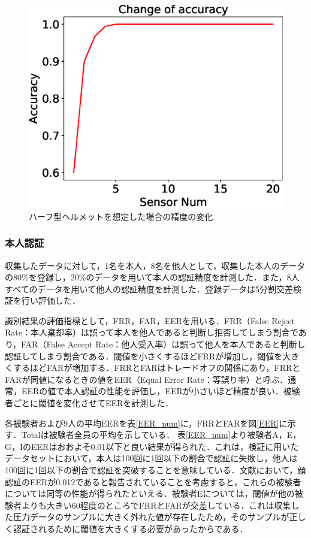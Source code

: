 \documentclass[Japanese,noauthor]{dicomopapers}
\begin{document}
\begin{figure}[!t]
  \centering
    \includegraphics[width=0.70\linewidth]{figure/half.eps}
  \caption{ハーフ型ヘルメットを想定した場合の精度の変化}
  \label{half}
\end{figure}

\subsubsection{本人認証}
収集したデータに対して，1名を本人，8名を他人として，収集した本人のデータの80\%を登録し，20\%のデータを用いて本人の認証精度を計測した．また，8人すべてのデータを用いて他人の認証精度を計測した．登録データは5分割交差検証を行い評価した．\par

識別結果の評価指標として，FRR，FAR，EERを用いる．FRR（False Reject Rate：本人棄却率）は誤って本人を他人であると判断し拒否してしまう割合であり，FAR（False Accept Rate：他人受入率）は誤って他人を本人であると判断し認証してしまう割合である．閾値を小さくするほどFRRが増加し，閾値を大きくするほどFARが増加する．FRRとFARはトレードオフの関係にあり，FRRとFARが同値になるときの値をEER（Equal Error Rate：等誤り率）と呼ぶ．通常，EERの値で本人認証の性能を評価し，EERが小さいほど精度が良い．被験者ごとに閾値を変化させてEERを計測した．\par

各被験者および9人の平均EERを表\ref{EER_num}に，FRRとFARを図\ref{EER}に示す．Totalは被験者全員の平均を示している．
表\ref{EER_num}より被験者A，E，G，IのEERはおおよそ0.01以下と良い結果が得られた．これは，検証に用いたデータセットにおいて，本人は100回に1回以下の割合で認証に失敗し，他人は100回に1回以下の割合で認証を突破することを意味している．文献\cite{face_auth}において，顔認証のEERが0.012であると報告されていることを考慮すると，これらの被験者については同等の性能が得られたといえる．被験者Eについては，閾値が他の被験者よりも大きい60程度のところでFRRとFARが交差している．これは収集した圧力データのサンプルに大きく外れた値が存在したため，そのサンプルが正しく認証されるために閾値を大きくする必要があったからである．\par
\end{document}
